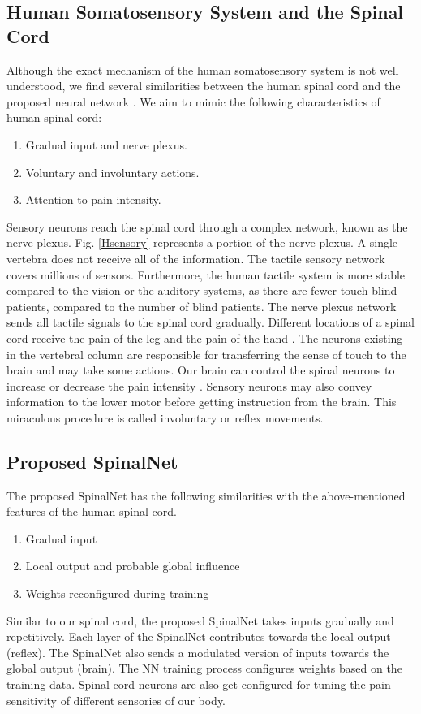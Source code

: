 \documentclass[journal]{IEEEtran}
\begin{document}
\subsection{Human Somatosensory System and the Spinal Cord}
Although the exact mechanism of the human somatosensory system is not well understood, we find several similarities between the human spinal cord and the proposed neural network \cite{d2008spinal}. We aim to mimic the following characteristics of human spinal cord:
\begin{enumerate}
	\item Gradual input and nerve plexus. 
	\item Voluntary and involuntary actions.
	\item Attention to pain intensity. 
\end{enumerate}


Sensory neurons reach the spinal cord through a complex network, known as the nerve plexus. Fig. \ref{Hsensory} represents a portion of the nerve plexus. A single vertebra does not receive all of the information. The tactile sensory network covers millions of sensors. Furthermore, the human tactile system is more stable compared to the vision or the auditory systems, as there are fewer touch-blind patients, compared to the number of blind patients. The nerve plexus network sends all tactile signals to the spinal cord gradually. Different locations of a spinal cord receive the pain of the leg and the pain of the hand \cite{d2008spinal}.
The neurons existing in the vertebral column are responsible for transferring the sense of touch to the brain and may take some actions. Our brain can control the spinal neurons to increase or decrease the pain intensity \cite{sprenger2012attention}. Sensory neurons may also convey information to the lower motor before getting instruction from the brain. This miraculous procedure is called involuntary or reflex movements.






\subsection{Proposed SpinalNet}

The proposed SpinalNet has the following similarities with the above-mentioned features of the human spinal cord.
\begin{enumerate}
    \item Gradual input 
    \item Local output and probable global influence
    \item Weights reconfigured during training
\end{enumerate}
Similar to our spinal cord, the proposed SpinalNet takes inputs gradually and repetitively. Each layer of the SpinalNet contributes towards the local output (reflex). The SpinalNet also sends a modulated version of inputs towards the global output (brain). The NN training process configures weights based on the training data. Spinal cord neurons are also get configured for tuning the pain sensitivity of different sensories of our body.
\end{document}

